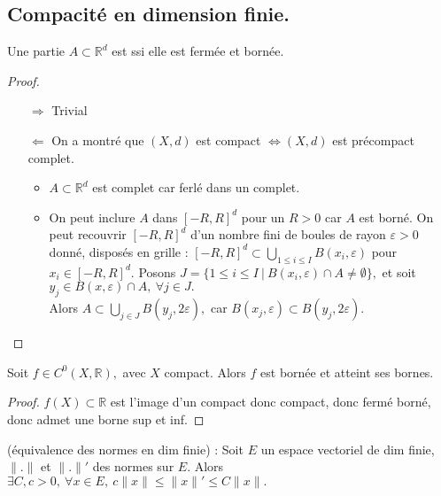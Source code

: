 \subsection{Compacité en dimension finie.}
\begin{propriete}
    Une partie $A\subset \mathbb{R} ^d$ est ssi elle est fermée et bornée.
\end{propriete}

\begin{proof}
    \begin{itemize}
        \item[$\Rightarrow$] Trivial
        \item[$\Leftarrow$] On a montré que $(X,d)$ est compact $\Leftrightarrow (X,d)$ est précompact complet.
            \begin{itemize}
                \item $A\subset \mathbb{R} ^d$ est complet car ferlé dans un complet.
                \item On peut inclure $A$ dans $[-R,R]^d $ pour un $R>0$ car $A$ est borné. On peut recouvrir $[-R,R]^d$ d'un nombre fini de boules de rayon $\varepsilon >0$ donné, disposés en grille : $[-R,R]^d\subset \bigcup\limits_{1\le i\le I} B(x_i,\varepsilon )$ pour $x_i\in [-R,R]^d.$ Posons $J=\{1\le i\le I\ |\ B(x_i,\varepsilon )\cap A\neq \emptyset \} ,$ et soit $y_j\in B(x,\varepsilon )\cap A,\ \forall j\in J.$ \\
                Alors $A\subset \bigcup\limits_{j\in J} B(y_j,2\varepsilon ),$ car $B(x_j, \varepsilon )\subset B(y_j, 2\varepsilon ).$
            \end{itemize}
    \end{itemize}
\end{proof}
\begin{corollaire}
    Soit $f\in C^0(X,\mathbb{R} ),$ avec $X$ compact. Alors $f$ est bornée et atteint ses bornes.
\end{corollaire}
\begin{proof}
    $f(X)\subset \mathbb{R} $ est l'image d'un compact donc compact, donc fermé borné, donc admet une borne sup et inf.
\end{proof}
\begin{corollaire}
    (équivalence des normes en dim finie) : Soit $E$ un espace vectoriel de dim finie, $\|.\|$ et $\|.\|'$ des normes sur $E.$ Alors $\exists C,c>0,\ \forall x\in E,\ c\|x\|\le \|x\|'\le C\|x\|. $
\end{corollaire}
